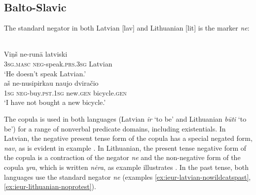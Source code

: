 ﻿\documentclass[output=paper]{langsci/langscibook}
\begin{document}
\subsection{Balto-Slavic}\label{sec:ieur-4.3}

The standard negator in both Latvian [lav] and Lithuanian [lit] is the marker \textit{ne}:
%
\begin{exe}
\ex\label{ex:ieur-latvian-speak}
\\
    \gll Viņš ne-runā latviski \\
\textsc{3sg.masc} \textsc{neg}-speak.\textsc{prs.3sg} Latvian \\
    \glt `He doesn't speak Latvian.' 
\ex\label{ex:ieur-lithuanian-bicycle}
\\
    \gll aš ne-nusipirkau naujo dviračio \\
\textsc{1sg} \textsc{neg}-buy.\textsc{pst.1sg}  new.\textsc{gen} bicycle.\textsc{gen} \\
    \glt `I have not bought a new bicycle.' 
    \end{exe}
%
The copula is used in both languages (Latvian \textit{ir} `to be' and
Lithuanian \textit{būti} `to be') for a range of nonverbal predicate
domains, including existentials. In Latvian, the negative
present tense form of the copula has a special negated form, \textit{nav},
as is evident in example . In
Lithuanian, the present tense negative form of the copula is
a contraction of the negator \textit{ne} and the non-negative form of the
copula \textit{yra}, which is written \textit{nėra}, as example
 illustrates
\citep[1976]{Mathiassen1996}. In the past tense, both languages use the
standard negator \textit{ne} (examples
\ref{ex:ieur-latvian-nowildcatspast}, \ref{ex:ieur-lithuanian-noprotest}). 
\end{document}
